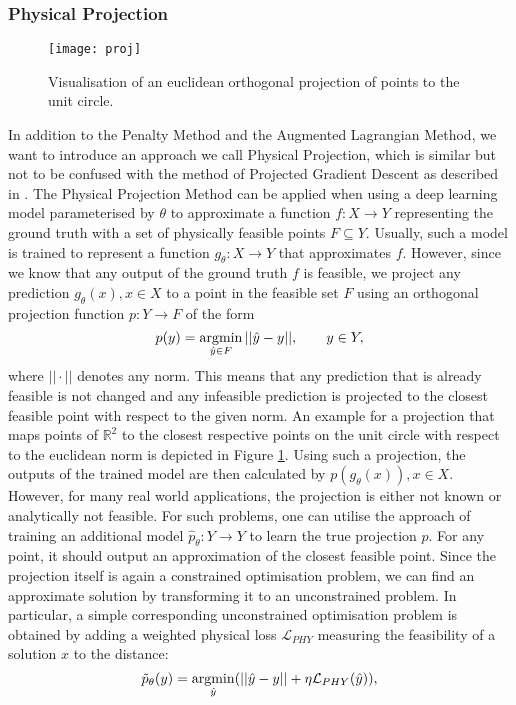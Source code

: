 \subsubsection{Physical Projection}
\begin{figure}[H]
	\texttt{[image: proj]}
	\caption{Visualisation of an euclidean orthogonal projection of points to the unit circle.}
	\label{fig:proj}
\end{figure}
In addition to the Penalty Method and the Augmented Lagrangian Method, we want to introduce an approach we call Physical Projection, which is similar but not to be confused with the method of Projected Gradient Descent as described in \cite{Chen}. The Physical Projection Method can be applied when using a deep learning model parameterised by $\theta$ to approximate a function $f: X \to Y$ representing the ground truth with a set of physically feasible points $F \subseteq Y$. Usually, such a model is trained to represent a function $g_\theta: X \to Y$ that approximates $f$. However, since we know that any output of the ground truth $f$ is feasible, we project any prediction $g_\theta(x), x \in X$ to a point in the feasible set $F$ using an orthogonal projection function $p: Y \to F$ of the form 
\[ p(y) = \operatorname*{argmin}_{\hat{y} \in F} ||\hat{y} - y||, \qquad y \in Y, \]
where $||\cdot||$ denotes any norm. This means that any prediction that is already feasible is not changed and any infeasible prediction is projected to the closest feasible point with respect to the given norm. An example for a projection that maps points of $\mathbb{R}^2$ to the closest respective points on the unit circle with respect to the euclidean norm is depicted in Figure \ref{fig:proj}. Using such a projection, the outputs of the trained model are then calculated by $p(g_\theta(x)), x\in X.$\\
\indent However, for many real world applications, the projection is either not known or analytically not feasible. For such problems, one can utilise the approach of training an additional model $\hat{p}_\theta: Y \to Y$ to learn the true projection $p$. For any point, it should output an approximation of the closest feasible point. Since the projection itself is again a constrained optimisation problem, we can find an approximate solution by transforming it to an unconstrained problem. In particular, a simple corresponding unconstrained optimisation problem is obtained by adding a weighted physical loss $\mathcal{L}_{PHY}$ measuring the feasibility of a solution $x$ to the distance:
\begin{equation}
\label{eq:phys_proj}
\tilde{p}_\theta(y) = \operatorname*{argmin}_{\hat{y}} (|| \hat{y} - y || + \eta \mathcal{L}_{PHY}(\hat{y})), 
\end{equation}
